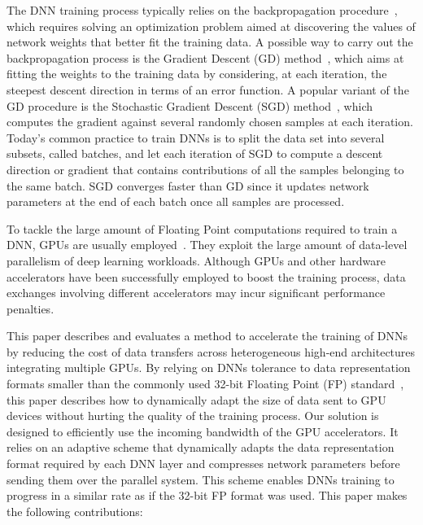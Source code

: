 The DNN training process typically relies on the backpropagation 
procedure~\cite{Werbos74}, which requires solving an optimization problem 
aimed at discovering the values of network weights that better fit the training data.
A possible way to carry out the backpropagation process is the Gradient Descent 
(GD) method~\cite{Press88}, which aims at fitting the weights to the training data by considering, at each iteration, the steepest descent direction in terms of an error function. 
A popular variant of the GD procedure is the Stochastic Gradient Descent 
(SGD) method~\cite{KieferWolfowitz1952}, which computes the gradient against several randomly chosen samples at each iteration. 
Today's common practice to train DNNs is to split the data set into several subsets, called batches, and let each iteration of SGD to compute a descent direction or gradient that contains contributions of all the samples belonging to the same batch.
SGD converges faster than GD since it updates network parameters at the end of each batch once all samples are processed.

To tackle the large amount of Floating Point computations required to train a DNN, GPUs are usually employed~\cite{You17}. 
They exploit the large amount of data-level parallelism of deep learning workloads. 
Although GPUs and other hardware accelerators have been successfully employed to 
boost the training process, data exchanges involving different accelerators may incur 
significant performance penalties. 

This paper describes and evaluates a method to accelerate the training of DNNs by reducing the cost 
of data transfers across heterogeneous high-end architectures integrating 
multiple GPUs. By relying on DNNs 
tolerance to data representation formats smaller than the commonly used 32-bit Floating Point (FP) standard~\cite{gupta15, flexpoint17}, this paper describes how to 
dynamically adapt the size of data sent to GPU devices without 
hurting the quality of the training process. 
Our solution is designed to efficiently use the incoming bandwidth of the GPU accelerators.
It relies on an adaptive scheme that dynamically adapts the data representation format required 
by each DNN layer and compresses network parameters before sending them over the parallel system.
This scheme enables DNNs training to progress in a similar rate as if the 32-bit FP format was used.
This paper makes the following contributions:%

